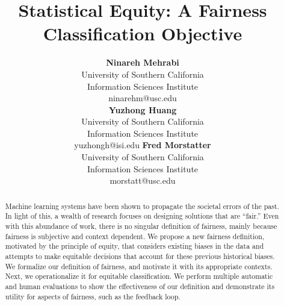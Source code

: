 \documentclass[letterpaper]{article}
\title{Statistical Equity: A Fairness Classification Objective}
\author{} %
\author{ {\bf Ninareh Mehrabi} \\
University of Southern California \\
Information Sciences Institute\\
ninarehm@usc.edu \\
\And
{\bf Yuzhong Huang}  \\
University of Southern California \\
Information Sciences Institute\\
yuzhongh@isi.edu
\And
{\bf Fred Morstatter}   \\
University of Southern California \\
Information Sciences Institute\\
morstatt@usc.edu
}
\begin{document}
\maketitle




\begin{abstract}
Machine learning systems have been shown to propagate the societal errors of the past. In light of this, a wealth of research focuses on designing solutions that are ``fair.'' Even with this abundance of work, there is no singular definition of fairness, mainly because fairness is subjective and context dependent. We propose a new fairness definition, motivated by the principle of equity, that considers existing biases in the data and attempts to make equitable decisions that account for these previous historical biases. We formalize our definition of fairness, and motivate it with its appropriate contexts. Next, we operationalize it for equitable classification. We perform multiple automatic and human evaluations to show the effectiveness of our definition and demonstrate its utility for aspects of fairness, such as the feedback loop.
\end{abstract}





 






\end{document}
